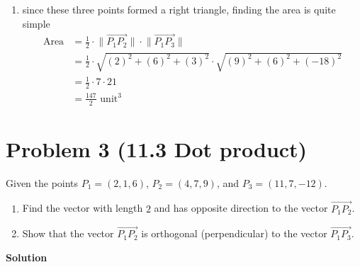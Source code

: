 \documentclass{article}
\newcommand{\solution}{\textbf{\large Solution}}
\theoremstyle{remark}
\begin{document}
\begin{enumerate}[label=(\alph*)]
      the dot product matches the expected result when the two vector are perpendicular, so we can conclude that these three points are the vertices of a right triangle. 
      \qed

    \item since these three points formed a right triangle, finding the area is quite simple
    \[
        \begin{aligned}
            \text{Area} &= \frac{1}{2} \cdot \lVert \overrightarrow{P_1P_2} \rVert \cdot \lVert \overrightarrow{P_1P_3} \rVert \\
            &= \frac{1}{2} \cdot \sqrt{(2)^2 + (6)^2 + (3)^2} \cdot \sqrt{(9)^2 + (6)^2 + (-18)^2} \\
            &= \frac{1}{2} \cdot 7 \cdot 21 \\
            &= \boxed{\frac{147}{2} \text{ unit}^3}
        \end{aligned}
    \]
\end{enumerate}

\vspace{1em}
\hrulefill

\section*{Problem 3 (11.3 Dot product)}
Given the points $P_1 = (2, 1, 6)$, $P_2 = (4, 7, 9)$, and $P_3 = (11, 7, -12)$.
\begin{enumerate}[label=(\alph*)]
    \item Find the vector with length $2$ and has opposite direction to the vector $\overrightarrow{P_1P_2}$.
    \item Show that the vector $\overrightarrow{P_1P_2}$ is orthogonal (perpendicular) to the vector $\overrightarrow{P_1P_3}$.
\end{enumerate}

\medskip
\solution
\end{document}
